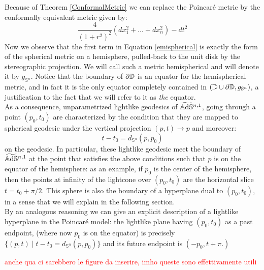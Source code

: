 Because of Theorem \ref{ConformalMetric} we can replace the Poincaré metric by the conformally equivalent metric given by:
\begin{equation}\label{emispherical}
    \frac{4}{(1+r^2)^2}(dx_1^2+\dots+dx_n^2)-dt^2
\end{equation} 
Now we observe that the first term in Equation \ref{emispherical} is exactly the form of the spherical metric on a hemisphere, pulled-back to the unit disk by the stereographic projection. We will call such a metric hemispherical and will denote it by $g_{\mathbb{S}^n}$. Notice that the boundary of $\partial\mathbb{D}$ is an equator for the hemispherical metric, and in fact it is the only equator completely contained in $(\mathbb{D}\cup\partial\mathbb{D},g_{\mathbb{S}^n})$, a justification to the fact that we will refer to it as \textit{the} equator.\\
As a consequence, unparametrized lightlike geodesics of $\widetilde{\mathbb{A}\mathrm{d}\mathbb{S}}{}^{n,1}$, going through a point $(p_0,t_0)$ are characterized by the condition that they are mapped to spherical geodesic under the vertical projection $(p,t)\to p$ and moreover: 
\[
    t-t_0=d_{\mathbb{S}^n}(p,p_0)
\] on the geodesic. In particular, these lightlike geodesic meet the boundary of $\widetilde{\mathbb{A}\mathrm{d}\mathbb{S}}{}^{n,1}$ at the point that satisfies the above conditions such that $p$ is on the equator of the hemisphere: as an example, if $p_0$ is the center of the hemisphere, then the points at infinity of the lightcone over $(p_0,t_0)$ are the horizontal slice $t=t_{0}+\pi/2.$ This sphere is also the boundary of a hyperplane dual to $(p_0,t_0)$, in a sense that we will explain in the following section. \\
By an analogous reasoning we can give an explicit description of a lightlike hyperplane in the Poincaré model: the lightlike plane having $(p_0,t_0)$ as a past endpoint, (where now $p_0$ is on the equator) is precisely $\{(p,t)\;|\;t-t_0=d_{\mathbb{S}^n}(p,p_0)\}$ and its future endpoint is $(-p_0,t+\pi.)$ 

\textcolor{red}{anche qua ci sarebbero le figure da inserire, imho queste sono effettivamente utili}

